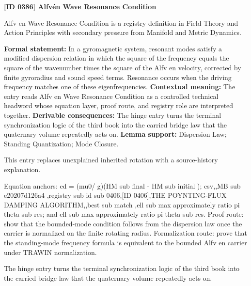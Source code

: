 \clearpage
\noindent\textbf{[ID 0386] Alfv\'en Wave Resonance Condition}\par
\vspace{0.35em}
\begingroup\small
{}
Alfv en Wave Resonance Condition is a registry definition in Field Theory and Action Principles with secondary pressure from Manifold and Metric Dynamics.

\begingroup\footnotesize\setlength{\emergencystretch}{3em}\sloppy
\textbf{Formal statement:} In a gyromagnetic system, resonant modes satisfy a modified dispersion relation in which the square of the frequency equals the square of the wavenumber times the square of the Alfv en velocity, corrected by finite gyroradius and sound speed terms. Resonance occurs when the driving frequency matches one of these eigenfrequencies. \textbf{Contextual meaning:} The entry reads Alfv en Wave Resonance Condition as a controlled technical headword whose equation layer, proof route, and registry role are interpreted together. \textbf{Derivable consequences:} The hinge entry turns the terminal synchronization logic of the third book into the carried bridge law that the quaternary volume repeatedly acts on. \textbf{Lemma support:} Dispersion Law; Standing Quantization; Mode Closure.\par
\endgroup

This entry replaces unexplained inherited rotation with a source-history explanation.

Equation anchors: ed = (mu0/ g)(HM sub final - HM sub initial ); csv,,MB sub e20207d126a4 ,registry sub id sub 0406,[ID 0406],THE POYNTING-FLUX DAMPING ALGORITHM,,best sub match ,ell sub max approximately ratio pi theta sub res; and ell sub max approximately ratio pi theta sub res. Proof route: show that the bounded-mode condition follows from the dispersion law once the carrier is normalized on the finite rotating radius. Formalization route: prove that the standing-mode frequency formula is equivalent to the bounded Alfv en carrier under TRAWIN normalization.

The hinge entry turns the terminal synchronization logic of the third book into the carried bridge law that the quaternary volume repeatedly acts on.
\endgroup

